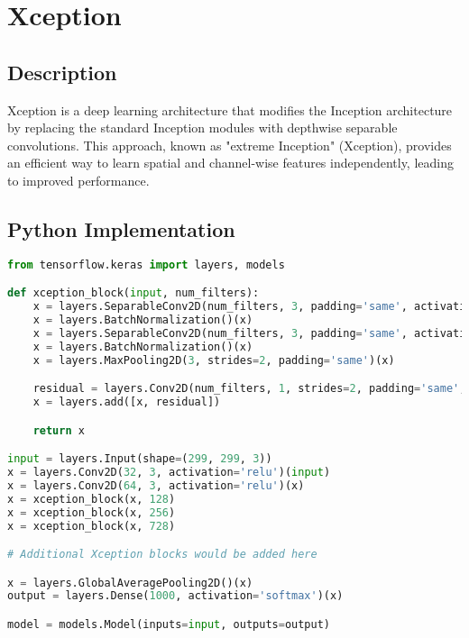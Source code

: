 \chapter{Xception}

\section{Description}
Xception is a deep learning architecture that modifies the Inception architecture by replacing the standard Inception modules with depthwise separable convolutions. This approach, known as "extreme Inception" (Xception), provides an efficient way to learn spatial and channel-wise features independently, leading to improved performance.

\section{Python Implementation}
\begin{lstlisting}[language=Python]
from tensorflow.keras import layers, models

def xception_block(input, num_filters):
    x = layers.SeparableConv2D(num_filters, 3, padding='same', activation='relu')(input)
    x = layers.BatchNormalization()(x)
    x = layers.SeparableConv2D(num_filters, 3, padding='same', activation='relu')(x)
    x = layers.BatchNormalization()(x)
    x = layers.MaxPooling2D(3, strides=2, padding='same')(x)

    residual = layers.Conv2D(num_filters, 1, strides=2, padding='same', activation='relu')(input)
    x = layers.add([x, residual])

    return x

input = layers.Input(shape=(299, 299, 3))
x = layers.Conv2D(32, 3, activation='relu')(input)
x = layers.Conv2D(64, 3, activation='relu')(x)
x = xception_block(x, 128)
x = xception_block(x, 256)
x = xception_block(x, 728)

# Additional Xception blocks would be added here

x = layers.GlobalAveragePooling2D()(x)
output = layers.Dense(1000, activation='softmax')(x)

model = models.Model(inputs=input, outputs=output)
\end{lstlisting}

